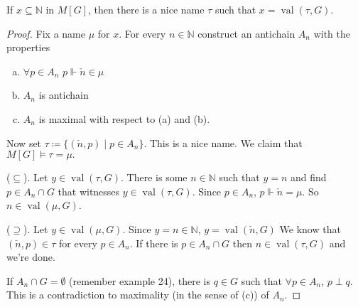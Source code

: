 \documentclass{article}
\newcommand{\1}{\mathbbm{1}}
\DeclareMathOperator{\val}{val}
\let\models\vDash
\let\forces\Vdash
\begin{document}
\begin{thm}
  If $x \subseteq \mathbb{N}$ in $M[G]$, then there is a nice name $\tau$ such that $x = \val(\tau,G)$.
\end{thm}
\begin{proof}
  Fix a name $\mu$ for $x$.
  For every $n \in \mathbb{N}$ construct an antichain $A_n$ with the properties
  \begin{enumerate}[(a)]
    \item $\forall p \in A_n$ $p \forces \check{n} \in \mu$
    \item $A_n$ is antichain
    \item $A_n$ is maximal with respect to (a) and (b).
  \end{enumerate}
  Now set $\tau \coloneqq \{(\check{n},p) \mid p \in A_n\}$. This is a nice name.
  We claim that $M[G] \models \tau = \mu.$

  ($\subseteq$). Let $y \in \val(\tau,G)$. There is some $n \in \mathbb{N}$ such that $y = n$ and find $p \in A_n \cap G$ that witnesses $y \in \val(\tau,G)$.
  Since $p \in A_n$, $p \forces \check{n} = \mu$.
  So $n \in \val(\mu,G)$.

  ($\supseteq$). Let $y \in \val(\mu,G)$. Since $y =n \in \mathbb{N}$, $y = \val(\check{n},G)$
  We know that $(\check{n},p) \in \tau$ for every $p \in A_n$. If there is $p \in A_n \cap G$ then $n \in \val(\tau,G)$ and we're done.

  If $A_n \cap G = \emptyset$ (remember example 24), there is $q \in G$ such that $\forall p \in A_n$, $p \perp q$.
  This is a contradiction to maximality (in the sense of (c)) of $A_n$.
\end{proof}
\printindex
\end{document}
